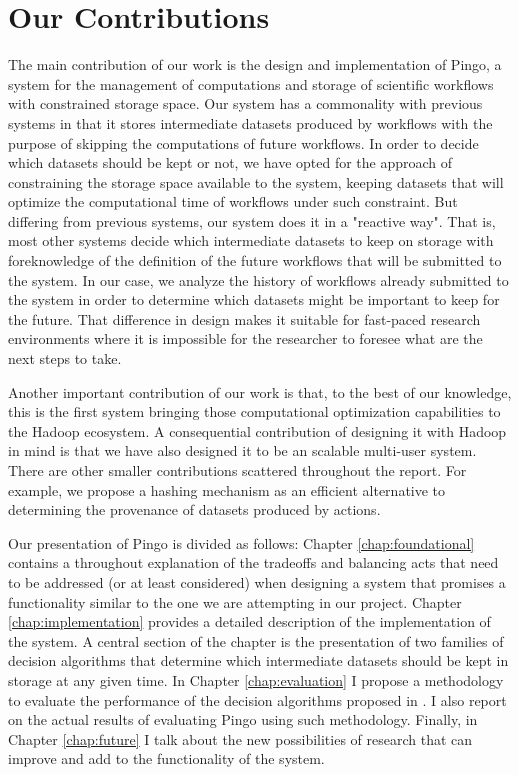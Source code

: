\section{Our Contributions}
The main contribution of our work is the design and implementation of Pingo, a system for the management of computations and storage of scientific workflows with constrained storage space. Our system has a commonality with previous systems in that it stores intermediate datasets produced by workflows with the purpose of skipping the computations of future workflows.  In order to decide which datasets should be kept or not, we have opted for the  approach of constraining the storage space available to the system, keeping datasets that will optimize the computational time of workflows under such constraint. But differing from previous systems, our system does it in a "reactive way".  That is, most other systems decide which intermediate datasets to keep on storage with foreknowledge of the definition of the future workflows that will be submitted to the system.  In our case, we analyze the history of workflows already submitted to the system in order to determine which datasets might be important to keep for the future. That difference in design makes it suitable for fast-paced research environments where it is impossible for the researcher to foresee what are the next steps to take.

Another important contribution of our work is that, to the best of our knowledge, this is the first system bringing those computational optimization capabilities to the Hadoop ecosystem.  A consequential contribution of designing it with Hadoop in mind is that we have also designed it to be an scalable multi-user system.  There are other smaller contributions scattered throughout the report. For example, we propose a hashing mechanism as an efficient alternative to determining the provenance of datasets produced by actions.  

Our presentation of Pingo is divided as follows: Chapter \ref{chap:foundational} contains a throughout explanation of the tradeoffs and balancing acts that need to be addressed (or at least considered) when designing a system that promises a functionality similar to the one we are attempting in our project. Chapter \ref{chap:implementation} provides a detailed description of the implementation of the system.  A central section of the chapter is the presentation of two families of decision algorithms that determine which intermediate datasets should be kept in storage at any given time. In Chapter \ref{chap:evaluation} I propose a methodology to evaluate the performance of the decision algorithms proposed in .  I also report on the actual results of evaluating Pingo using such methodology.  Finally, in Chapter \ref{chap:future} I talk about the new possibilities of research that can improve and add to the functionality of the system.

